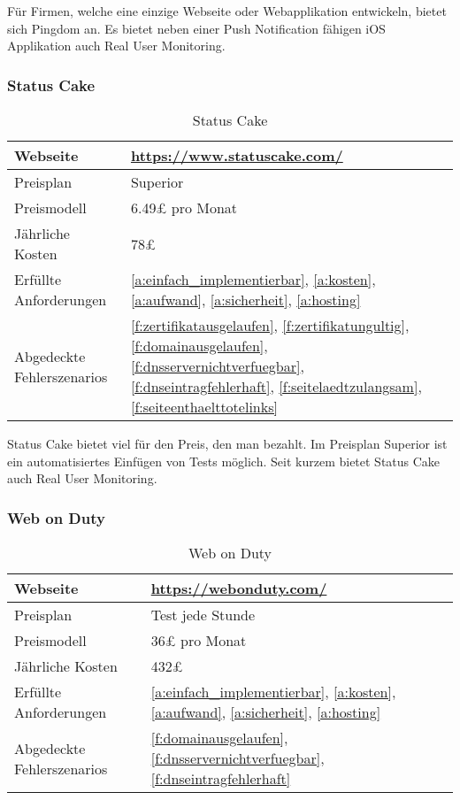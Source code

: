 Für Firmen, welche eine einzige Webseite oder Webapplikation entwickeln, bietet sich Pingdom an. Es bietet neben einer Push Notification fähigen iOS Applikation auch Real User Monitoring.

\subsubsection{Status Cake}
\label{ssub:status_cake}

\begin{table}[H]
  \centering
  \begin{tabular}{p{5cm} p{7cm}}
  \toprule
    Webseite & \url{https://www.statuscake.com/}\\
  \hline
    Preisplan & Superior\\
  \hline
    Preismodell & 6.49£ pro Monat\\
  \hline
    Jährliche Kosten & 78£\\
  \hline
    Erfüllte Anforderungen & \ref{a:einfach_implementierbar}, \ref{a:kosten}, \ref{a:aufwand}, \ref{a:sicherheit}, \ref{a:hosting}\\
  \hline
    Abgedeckte Fehlerszenarios & \ref{f:zertifikatausgelaufen}, \ref{f:zertifikatungultig}, \ref{f:domainausgelaufen}, \ref{f:dnsservernichtverfuegbar}, \ref{f:dnseintragfehlerhaft}, \ref{f:seitelaedtzulangsam}, \ref{f:seiteenthaelttotelinks}\\
  \bottomrule
  \end{tabular}
  \caption{Status Cake}
  \label{tab:status_cake}
\end{table}

Status Cake bietet viel für den Preis, den man bezahlt. Im Preisplan Superior ist ein automatisiertes Einfügen von Tests möglich. Seit kurzem bietet Status Cake auch Real User Monitoring.

\subsubsection{Web on Duty}
\label{ssub:web_on_duty}

\begin{table}[H]
  \centering
  \begin{tabular}{p{5cm} p{7cm}}
  \toprule
    Webseite & \url{https://webonduty.com/}\\
  \hline
    Preisplan & Test jede Stunde\\
  \hline
    Preismodell & 36£ pro Monat\\
  \hline
    Jährliche Kosten & 432£\\
  \hline
    Erfüllte Anforderungen & \ref{a:einfach_implementierbar}, \ref{a:kosten}, \ref{a:aufwand}, \ref{a:sicherheit}, \ref{a:hosting}\\
  \hline
    Abgedeckte Fehlerszenarios & \ref{f:domainausgelaufen}, \ref{f:dnsservernichtverfuegbar}, \ref{f:dnseintragfehlerhaft}\\
  \bottomrule
  \end{tabular}
  \caption{Web on Duty}
  \label{tab:web_on_duty}
\end{table}

